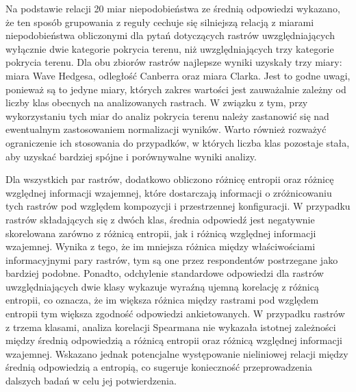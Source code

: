 \documentclass{amuthesis}
\begin{document}
Na podstawie relacji 20 miar niepodobieństwa ze średnią odpowiedzi
wykazano, że ten sposób grupowania z reguły cechuje się silniejszą
relacją z miarami niepodobieństwa obliczonymi dla pytań dotyczących
rastrów uwzględniających wyłącznie dwie kategorie pokrycia terenu, niż
uwzględniających trzy kategorie pokrycia terenu. Dla obu zbiorów rastrów
najlepsze wyniki uzyskały trzy miary: miara Wave Hedgesa, odległość
Canberra oraz miara Clarka. Jest to godne uwagi, ponieważ są to jedyne
miary, których zakres wartości jest zauważalnie zależny od liczby klas
obecnych na analizowanych rastrach. W związku z tym, przy wykorzystaniu
tych miar do analiz pokrycia terenu należy zastanowić się nad
ewentualnym zastosowaniem normalizacji wyników. Warto również rozważyć
ograniczenie ich stosowania do przypadków, w których liczba klas
pozostaje stała, aby uzyskać bardziej spójne i porównywalne wyniki
analizy.

Dla wszystkich par rastrów, dodatkowo obliczono różnicę entropii oraz
różnicę względnej informacji wzajemnej, które dostarczają informacji o
zróżnicowaniu tych rastrów pod względem kompozycji i przestrzennej
konfiguracji. W przypadku rastrów składających się z dwóch klas, średnia
odpowiedź jest negatywnie skorelowana zarówno z różnicą entropii, jak i
różnicą względnej informacji wzajemnej. Wynika z tego, że im mniejsza
różnica między właściwościami informacyjnymi pary rastrów, tym są one
przez respondentów postrzegane jako bardziej podobne. Ponadto,
odchylenie standardowe odpowiedzi dla rastrów uwzględniających dwie
klasy wykazuje wyraźną ujemną korelację z różnicą entropii, co oznacza,
że im większa różnica między rastrami pod względem entropii tym większa
zgodność odpowiedzi ankietowanych. W przypadku rastrów z trzema klasami,
analiza korelacji Spearmana nie wykazała istotnej zależności między
średnią odpowiedzią a różnicą entropii oraz różnicą względnej informacji
wzajemnej. Wskazano jednak potencjalne występowanie nieliniowej relacji
między średnią odpowiedzią a entropią, co sugeruje konieczność
przeprowadzenia dalszych badań w celu jej potwierdzenia.
\end{document}
